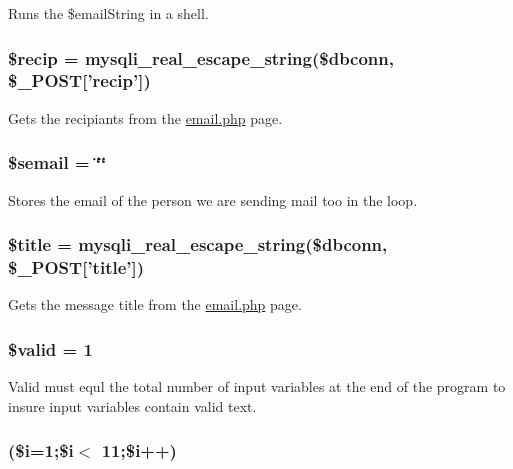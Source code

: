 \-Runs the \$email\-String in a shell. \hypertarget{sendMail_8php_a6f4e87f5425e063c148526b2f75d2a3b}{
\subsubsection[{\$recip}]{\setlength{\rightskip}{0pt plus 5cm}\$recip = mysqli\-\_\-real\-\_\-escape\-\_\-string(\$dbconn, \$\-\_\-\-P\-O\-S\-T\mbox{[}'recip'\mbox{]})}}\label{sendMail_8php_a6f4e87f5425e063c148526b2f75d2a3b}
\-Gets the recipiants from the \hyperlink{email_8php}{email.\-php} page. \hypertarget{sendMail_8php_a4bf9ea5c2d7c2941d7ed61f245159bbf}{
\subsubsection[{\$semail}]{\setlength{\rightskip}{0pt plus 5cm}\$semail = \char`\"{}\char`\"{}}}\label{sendMail_8php_a4bf9ea5c2d7c2941d7ed61f245159bbf}
\-Stores the email of the person we are sending mail too in the loop. \hypertarget{sendMail_8php_ada57e7bb7c152edad18fe2f166188691}{
\subsubsection[{\$title}]{\setlength{\rightskip}{0pt plus 5cm}\$title = mysqli\-\_\-real\-\_\-escape\-\_\-string(\$dbconn, \$\-\_\-\-P\-O\-S\-T\mbox{[}'title'\mbox{]})}}\label{sendMail_8php_ada57e7bb7c152edad18fe2f166188691}
\-Gets the message title from the \hyperlink{email_8php}{email.\-php} page. \hypertarget{sendMail_8php_a0587674d27d00ef497e08e53ccf45bbb}{
\subsubsection[{\$valid}]{\setlength{\rightskip}{0pt plus 5cm}\$valid = 1}}\label{sendMail_8php_a0587674d27d00ef497e08e53ccf45bbb}
\-Valid must equl the total number of input variables at the end of the program to insure input variables contain valid text. \hypertarget{sendMail_8php_a97c5d50455f68774b384f988b990d00f}{
\subsubsection[{for}]{(\$i=1;\$i$<$ 11;\$i++)}}\label{sendMail_8php_a97c5d50455f68774b384f988b990d00f}
